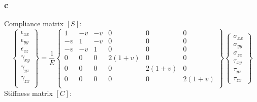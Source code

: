 \documentclass[11pt]{article}
\numberwithin{equation}{section}
\begin{document}
\subsubsection{c}
Compliance matrix $[S]$:
\begin{equation}
    \begin{Bmatrix}
        \epsilon_{xx} \\
        \epsilon_{yy} \\
        \epsilon_{zz} \\
        \gamma_{xy}   \\
        \gamma_{yz}   \\
        \gamma_{zx}   \\
    \end{Bmatrix} = \frac{1}{E}
    \begin{Bmatrix}
        1  & -v & -v & 0      & 0      & 0      \\
        -v & 1  & -v & 0      & 0      & 0      \\
        -v & -v & 1  & 0      & 0      & 0      \\
        0  & 0  & 0  & 2(1+v) & 0      & 0      \\
        0  & 0  & 0  & 0      & 2(1+v) & 0      \\
        0  & 0  & 0  & 0      & 0      & 2(1+v) \\
    \end{Bmatrix}
    \begin{Bmatrix}
        \sigma_{xx} \\
        \sigma_{yy} \\
        \sigma_{zz} \\
        \tau_{xy}   \\
        \tau_{yz}   \\
        \tau_{zx}
    \end{Bmatrix}
\end{equation}
Stiffness matrix $[C]$:
\end{document}
